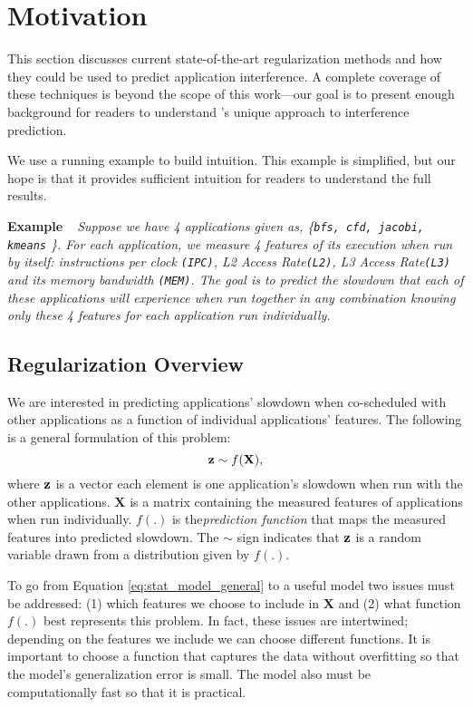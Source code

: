 \section{Motivation}
\label{sec:regression}
This section discusses current state-of-the-art regularization methods
and how they could be used to predict application interference.  A
complete coverage of these techniques is beyond the scope of this
work---our goal is to present enough background for readers to
understand \SYSTEMESP{}'s unique approach to interference prediction.

We use a running example to build intuition.  This example is
simplified, but our hope is that it provides sufficient intuition for
readers to understand the full results.

\noindent \textbf{Example~~}\textit{Suppose we have 4 applications
  given as, \{\texttt{bfs, cfd, jacobi, kmeans} \}.  For each
  application, we measure 4 features of its execution when run by
  itself: instructions per clock \texttt{(IPC)}, L2 Access
  Rate\texttt{(L2)}, L3 Access Rate\texttt{(L3)} and its memory
  bandwidth \texttt{(MEM)}.  The goal is to predict the slowdown that
  each of these applications will experience when run together in any
  combination knowing only these 4 features for each application run
  individually.  }

\subsection{Regularization Overview}
We are interested in predicting applications' slowdown when
co-scheduled with other applications as a function of individual
applications' features. The following is a general formulation of this
problem:
\begin{equation}
\label{eq:stat_model_general}
\mathbf{z} \sim f(\mathbf{X}),
\end{equation}
where $\mathbf{z}$ is a vector each element is one application's slowdown when
run with the other applications.  $\mathbf{X}$ is a matrix containing
the measured features of applications when run individually.  $f(.)$
is the\emph{prediction function} that maps the measured features into
predicted slowdown.  The $\sim$ sign indicates that $\mathbf{z}$ is a random
variable drawn from a distribution given by $f(.)$.

To go from Equation \eqref{eq:stat_model_general} to a useful model
two issues must be addressed: (1) which features we choose to include
in $\mathbf{X}$ and (2) what function $f(.)$ best represents this
problem. In fact, these issues are intertwined; depending on the
features we include we can choose different functions.  It is
important to choose a function that captures the data without
overfitting so that the model's generalization error is small.  The
model also must be computationally fast so that it is practical.

